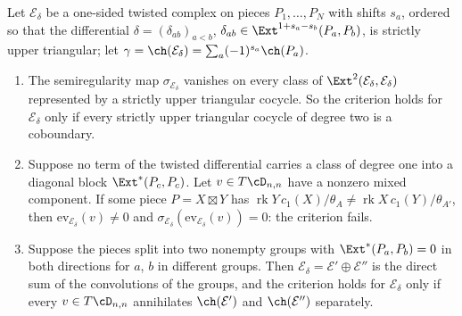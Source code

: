 \begin{proposition}[Convolutions]\label{prop:convolution}
Let $\mathcal{E}_{\delta}$ be a one-sided twisted complex on pieces $P_{1},\dots,P_{N}$ with shifts $s_{a}$, ordered so that the differential $\delta=(\delta_{ab})_{a<b}$, $\delta_{ab}\in\Ext^{1+s_{a}-s_{b}}(P_{a},P_{b})$, is strictly upper triangular; let $\gamma=\ch(\mathcal{E}_{\delta})=\sum_{a}(-1)^{s_{a}}\ch(P_{a})$.
\begin{enumerate}[label=\textup{(\roman*)},leftmargin=2.4em,itemsep=2pt]
\item The semiregularity map $\sigma_{\mathcal{E}_{\delta}}$ vanishes on every class of $\Ext^{2}(\mathcal{E}_{\delta},\mathcal{E}_{\delta})$ represented by a strictly upper triangular cocycle. So the criterion holds for $\mathcal{E}_{\delta}$ only if every strictly upper triangular cocycle of degree two is a coboundary.
\item Suppose no term of the twisted differential carries a class of degree one into a diagonal block $\Ext^{*}(P_{c},P_{c})$. Let $v\in T\cD_{n,n}$ have a nonzero mixed component. If some piece $P=X\boxtimes Y$ has $\operatorname{rk}Y\,c_{1}(X)/\theta_{A}\ne\operatorname{rk}X\,c_{1}(Y)/\theta_{A'}$, then $\mathrm{ev}_{\mathcal{E}_{\delta}}(v)\ne0$ and $\sigma_{\mathcal{E}_{\delta}}(\mathrm{ev}_{\mathcal{E}_{\delta}}(v))=0$: the criterion fails.
\item Suppose the pieces split into two nonempty groups with $\Ext^{*}(P_{a},P_{b})=0$ in both directions for $a$, $b$ in different groups. Then $\mathcal{E}_{\delta}=\mathcal{E}'\oplus\mathcal{E}''$ is the direct sum of the convolutions of the groups, and the criterion holds for $\mathcal{E}_{\delta}$ only if every $v\in T\cD_{n,n}$ annihilates $\ch(\mathcal{E}')$ and $\ch(\mathcal{E}'')$ separately.
\end{enumerate}
\end{proposition}

